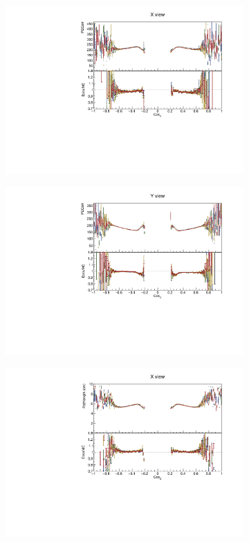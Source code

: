 \begin{figure}[!ht]
\begin{subfigure}{0.5\textwidth}
  \end{subfigure}
  \begin{subfigure}{0.5\textwidth}
    \includegraphics[width=\linewidth]{PlotsAngularDistribution/pecorr_cosz_x.pdf}
  \end{subfigure}
  \begin{subfigure}{0.5\textwidth}
    \includegraphics[width=\linewidth]{PlotsAngularDistribution/pecorr_cosz_y.pdf}
  \end{subfigure}
  \begin{subfigure}{0.5\textwidth}
    \includegraphics[width=\linewidth]{PlotsAngularDistribution/cm_cosz_x.pdf}

\end{subfigure}
\end{figure}
